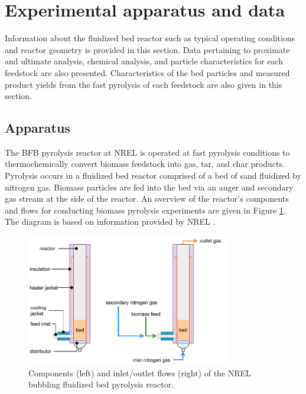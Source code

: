 
\section{Experimental apparatus and data}

Information about the fluidized bed reactor such as typical operating conditions and reactor geometry is provided in this section. Data pertaining to proximate and ultimate analysis, chemical analysis, and particle characteristics for each feedstock are also presented. Characteristics of the bed particles and measured product yields from the fast pyrolysis of each feedstock are also given in this section.

\subsection{Apparatus}

The BFB pyrolysis reactor at NREL is operated at fast pyrolysis conditions to thermochemically convert biomass feedstock into gas, tar, and char products. Pyrolysis occurs in a fluidized bed reactor comprised of a bed of sand fluidized by nitrogen gas. Biomass particles are fed into the bed via an auger and secondary gas stream at the side of the reactor. An overview of the reactor's components and flows for conducting biomass pyrolysis experiments are given in Figure \ref{fig:pyrolyzer1}. The diagram is based on information provided by NREL \cite{French-2019}.

\begin{figure}[H]
    \centering
    \includegraphics[width=0.8\textwidth]{figures/pyrolyzer1.pdf}
    \caption{Components (left) and inlet/outlet flows (right) of the NREL bubbling fluidized bed pyrolysis reactor.}
    \label{fig:pyrolyzer1}
\end{figure}

